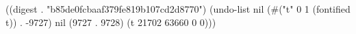 
((digest . "b85de0fcbaaf379fe819b107cd2d8770") (undo-list nil (#("t" 0 1 (fontified t)) . -9727) nil (9727 . 9728) (t 21702 63660 0 0)))
